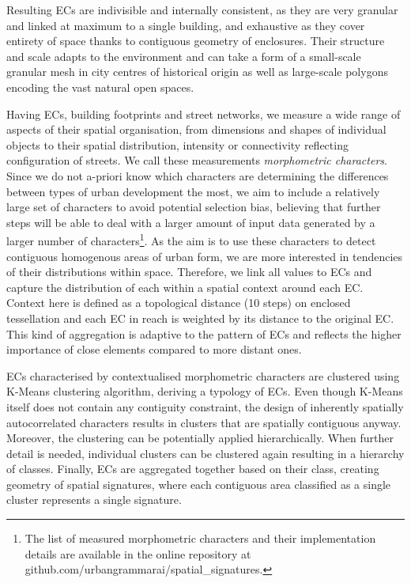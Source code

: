 Resulting ECs are indivisible and internally consistent, as they are very granular and
linked at maximum to a single building, and exhaustive as they cover entirety of space
thanks to contiguous geometry of enclosures. Their structure and scale adapts to the
environment and can take a form of a small-scale granular mesh in city centres of
historical origin as well as large-scale polygons encoding the vast natural open spaces.

Having ECs, building footprints and street networks, we measure a wide range of aspects
of their spatial organisation, from dimensions and shapes of individual objects to their
spatial distribution, intensity or connectivity reflecting configuration of streets. We
call these measurements \textit{morphometric characters}. Since we do not a-priori know
which characters are determining the differences between types of urban
development the most, we aim to include a relatively large set of characters to
avoid potential selection bias, believing that further steps will be able to deal with a
larger amount of input data generated by a larger number of characters\footnote{The list
of measured morphometric characters and their implementation details are available in
the online repository at github.com/urbangrammarai/spatial\_signatures.}. As the aim is
to use these characters to detect contiguous homogenous areas of urban form, we are more
interested in tendencies of their distributions within space. Therefore, we link all
values to ECs and capture the distribution of each within a spatial context
around each EC. Context here is defined as a topological distance (10 steps) on enclosed
tessellation and each EC in reach is weighted by its distance to the original EC. This
kind of aggregation is adaptive to the pattern of ECs and reflects the higher importance
of close elements compared to more distant ones.

ECs characterised by contextualised morphometric characters are clustered using K-Means
clustering algorithm, deriving a typology of ECs. Even though K-Means itself does not
contain any contiguity constraint, the design of inherently spatially autocorrelated
characters results in clusters that are spatially contiguous anyway. Moreover, the clustering can
be potentially applied hierarchically. When further detail is needed, individual
clusters can be clustered again resulting in a hierarchy of classes. Finally, ECs are
aggregated together based on their class, creating geometry of spatial signatures, where
each contiguous area classified as a single cluster represents a single signature.

